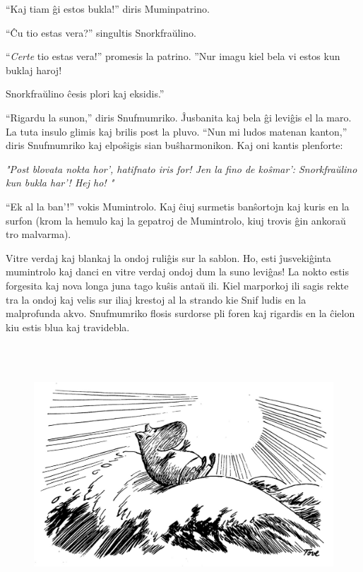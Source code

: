 ``Kaj tiam ĝi estos bukla!'' diris Muminpatrino.

``Ĉu tio estas vera?'' singultis Snorkfraŭlino.

``\emph{Certe} tio estas vera!'' promesis la patrino. ''Nur imagu kiel bela vi estos kun buklaj haroj!

Snorkfraŭlino ĉesis plori kaj eksidis.''

``Rigardu la sunon,'' diris Snufmumriko. Ĵusbanita kaj bela ĝi leviĝis el la maro. La tuta insulo glimis kaj brilis post la pluvo. ``Nun mi ludos matenan kanton,'' diris Snufmumriko kaj elpoŝigis sian buŝharmonikon. Kaj oni kantis plenforte:

\begin{center}\itshape "Post blovata nokta hor',  
hatifnato iris for!  
Jen la fino de koŝmar':  
Snorkfraŭlino kun bukla har'!  
Hej ho! "\\\end{center}

``Ek al la ban'!'' vokis Mumintrolo. Kaj ĉiuj surmetis banŝortojn kaj kuris en la surfon (krom la hemulo kaj la gepatroj de Mumintrolo, kiuj trovis ĝin ankoraŭ tro malvarma).

Vitre verdaj kaj blankaj la ondoj ruliĝis sur la sablon. Ho, esti ĵusvekiĝinta mumintrolo kaj danci en vitre verdaj ondoj dum la suno leviĝas! La nokto estis forgesita kaj nova longa juna tago kuŝis antaŭ ili. Kiel marporkoj ili sagis rekte tra la ondoj kaj velis sur iliaj krestoj al la strando kie Snif ludis en la malprofunda akvo. Snufmumriko flosis surdorse pli foren kaj rigardis en la ĉielon kiu estis blua kaj travidebla.

\begin{figure}[htbp]
\centering
\includegraphics[width=447pt,height=276pt]{_18.jpg}
\caption{}
\label{_18}
\end{figure}

